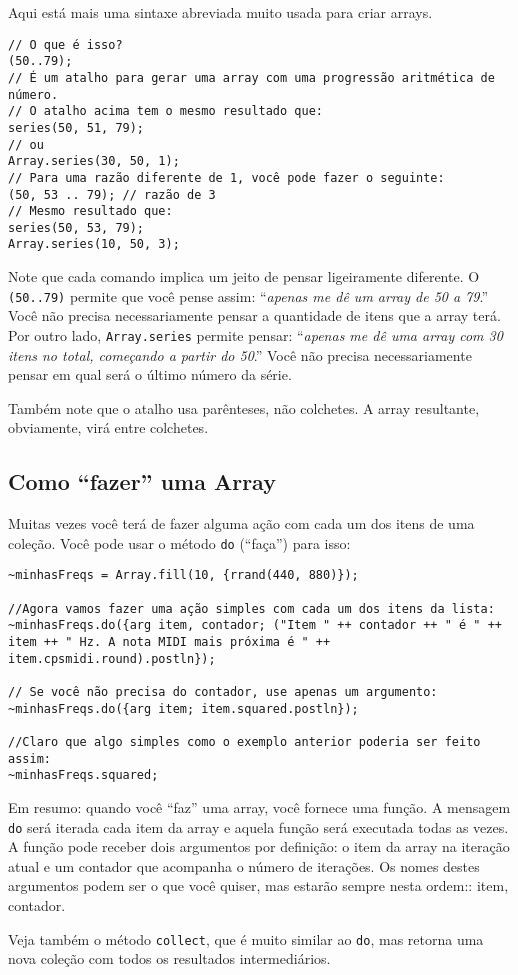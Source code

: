 Aqui está mais uma sintaxe abreviada muito usada para criar arrays.

 
\begin{lstlisting}[style=SuperCollider-IDE, basicstyle=\scttfamily\footnotesize]
// O que é isso?
(50..79);
// É um atalho para gerar uma array com uma progressão aritmética de número.
// O atalho acima tem o mesmo resultado que:
series(50, 51, 79);
// ou
Array.series(30, 50, 1);
// Para uma razão diferente de 1, você pode fazer o seguinte:
(50, 53 .. 79); // razão de 3
// Mesmo resultado que:
series(50, 53, 79);
Array.series(10, 50, 3);
\end{lstlisting}

Note que cada comando implica um jeito de pensar ligeiramente diferente. O \texttt{(50..79)} permite que você pense assim: “\emph{apenas me dê um array de 50 a 79}.” Você não precisa necessariamente pensar a quantidade de itens que a array terá. Por outro lado, \texttt{Array.series} permite pensar: “\emph{apenas me dê uma array com 30 itens no total, começando a partir do 50}.” Você não precisa necessariamente pensar em qual será o último número da série.

Também note que o atalho usa parênteses, não colchetes. A array resultante, obviamente, virá entre colchetes.
\subsection{Como “fazer” uma Array}

Muitas vezes você terá de fazer alguma ação com cada um dos itens de uma coleção. Você pode usar o método \texttt{do} (“faça”) para isso:


\begin{lstlisting}[style=SuperCollider-IDE, basicstyle=\scttfamily\footnotesize]
~minhasFreqs = Array.fill(10, {rrand(440, 880)});

//Agora vamos fazer uma ação simples com cada um dos itens da lista:
~minhasFreqs.do({arg item, contador; ("Item " ++ contador ++ " é " ++ item ++ " Hz. A nota MIDI mais próxima é " ++ item.cpsmidi.round).postln});

// Se você não precisa do contador, use apenas um argumento:
~minhasFreqs.do({arg item; item.squared.postln});

//Claro que algo simples como o exemplo anterior poderia ser feito assim:
~minhasFreqs.squared;
\end{lstlisting}
 

Em resumo: quando você “faz” uma array, você fornece uma função. A mensagem \texttt{do} será iterada cada item da array e aquela função será executada todas as vezes. A função pode receber dois argumentos por definição: o item da array na iteração atual e um contador que acompanha o número de iterações. Os nomes destes argumentos podem ser o que você quiser, mas estarão sempre nesta ordem:: item, contador.

Veja também o método \texttt{collect}, que é muito similar ao \texttt{do}, mas retorna uma nova coleção com todos os resultados intermediários.
